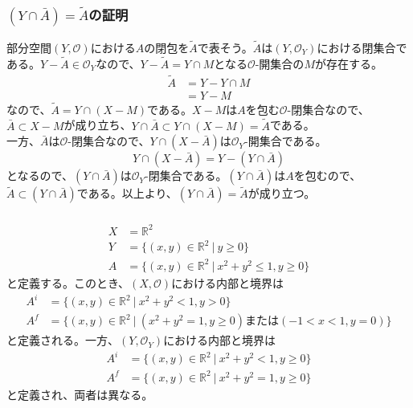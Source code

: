 \documentclass{jsarticle}
\begin{document}
\subsection{}
\subsubsection{$(Y\cap\bar{A})=\tilde{A}$の証明}
部分空間$(Y,\mathcal{O})$における$A$の閉包を$\tilde{A}$で表そう。$\tilde{A}$は$(Y,\mathcal{O}_{Y})$における閉集合である。$Y-\tilde{A}\in\mathcal{O}_Y$なので、$Y-\tilde{A}=Y\cap M$となる$\mathcal{O}$-開集合の$M$が存在する。
\begin{align*}
\tilde{A}&=Y-Y\cap M\\
&=Y-M
\end{align*}
なので、$\tilde{A}=Y\cap(X-M)$である。$X-M$は$A$を包む$\mathcal{O}$-閉集合なので、$\bar{A}\subset X-M$が成り立ち、$Y\cap\bar{A}\subset Y\cap(X-M)= \tilde{A}$である。\\
一方、$\bar{A}$は$\mathcal{O}$-閉集合なので、$Y\cap(X-\bar{A})$は$\mathcal{O}_Y$-開集合である。
\[Y\cap(X-\bar{A})=Y-(Y\cap\bar{A})\]
となるので、$(Y\cap\bar{A})$は$\mathcal{O}_Y$-閉集合である。$(Y\cap\bar{A})$は$A$を包むので、$\tilde{A}\subset(Y\cap\bar{A})$である。以上より、$(Y\cap\bar{A})=\tilde{A}$が成り立つ。

\subsubsection{}
\begin{align*}
X&=\mathbb{R}^2\\
Y&=\{(x,y)\in\mathbb{R}^2\ |\ y\geq0\}\\
A&=\{(x,y)\in\mathbb{R}^2\ |\ x^2+y^2\leq 1, y\geq0\}
\end{align*}
と定義する。このとき、$(X,\mathcal{O})$における内部と境界は
\begin{align*}
A^i&=\{(x,y)\in\mathbb{R}^2\ |\ x^2+y^2< 1, y>0\}\\
A^f&=\{(x,y)\in\mathbb{R}^2\ |\ (x^2+y^2=1,y\geq 0) または (-1< x< 1,y=0)\}
\end{align*}
と定義される。一方、$(Y,\mathcal{O}_Y)$における内部と境界は
\begin{align*}
A^i&=\{(x,y)\in\mathbb{R}^2\ |\ x^2+y^2< 1, y\geq 0\}\\
A^f&=\{(x,y)\in\mathbb{R}^2\ |\ x^2+y^2=1,y\geq 0\}
\end{align*}
と定義され、両者は異なる。


\end{document}
